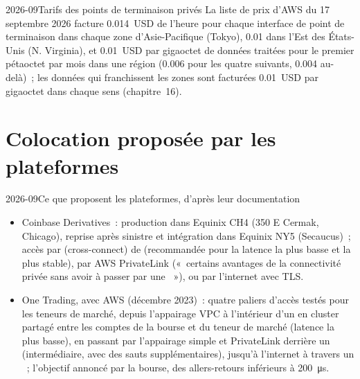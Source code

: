 \label{lst:nw:private-connectivity-to-crypto-venues:path}

\begin{dated}{2026-09}{Tarifs des points de terminaison privés}\label{dat:nw:private-connectivity-to-crypto-venues:prices}
La liste de prix d'AWS du 17 septembre 2026 facture 0.014~USD de l'heure pour chaque interface de point de terminaison dans chaque zone d'Asie-Pacifique (Tokyo), 0.01 dans l'Est des États-Unis
(N. Virginia), et 0.01~USD par gigaoctet de données traitées pour le premier pétaoctet par mois dans une région (0.006 pour les quatre suivants, 0.004 au-delà)~; les données
qui franchissent les zones sont facturées 0.01~USD par gigaoctet dans chaque sens (chapitre~16).
\end{dated}

\section{Colocation proposée par les plateformes}

\begin{dated}{2026-09}{Ce que proposent les plateformes, d'après leur documentation}\label{dat:nw:private-connectivity-to-crypto-venues:offers}
\begin{itemize}
\item Coinbase Derivatives~: production dans Equinix CH4 (350 E Cermak, Chicago), reprise après sinistre et intégration dans Equinix NY5 (Secaucus)~; accès par
   (cross-connect) de  (recommandée pour la latence la plus basse et la plus stable), par AWS PrivateLink («~certains avantages de la connectivité privée
  sans avoir à passer par une ~»), ou par l'internet avec TLS.
\item One Trading, avec AWS (décembre 2023)~: quatre paliers d'accès testés pour les teneurs de marché, depuis l'appairage VPC à l'intérieur d'un  en cluster partagé
  entre les comptes de la bourse et du teneur de marché (latence la plus basse), en passant par l'appairage simple et PrivateLink derrière un 
  (intermédiaire, avec des sauts supplémentaires), jusqu'à l'internet à travers un ~; l'objectif annoncé par la bourse, des allers-retours inférieurs à \qty{200}{\micro\second}.
\end{itemize}
\end{dated}

